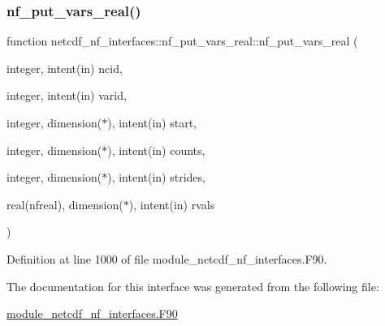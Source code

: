 \subsubsection{\texorpdfstring{nf\+\_\+put\+\_\+vars\+\_\+real()}{nf\_put\_vars\_real()}}
{\footnotesize\ttfamily function netcdf\+\_\+nf\+\_\+interfaces\+::nf\+\_\+put\+\_\+vars\+\_\+real\+::nf\+\_\+put\+\_\+vars\+\_\+real (\begin{DoxyParamCaption}\item[{integer, intent(in)}]{ncid,  }\item[{integer, intent(in)}]{varid,  }\item[{integer, dimension($\ast$), intent(in)}]{start,  }\item[{integer, dimension($\ast$), intent(in)}]{counts,  }\item[{integer, dimension($\ast$), intent(in)}]{strides,  }\item[{real(nfreal), dimension($\ast$), intent(in)}]{rvals }\end{DoxyParamCaption})}



Definition at line 1000 of file module\+\_\+netcdf\+\_\+nf\+\_\+interfaces.\+F90.



The documentation for this interface was generated from the following file\+:\begin{DoxyCompactItemize}
\item 
\hyperlink{module__netcdf__nf__interfaces_8F90}{module\+\_\+netcdf\+\_\+nf\+\_\+interfaces.\+F90}\end{DoxyCompactItemize}
